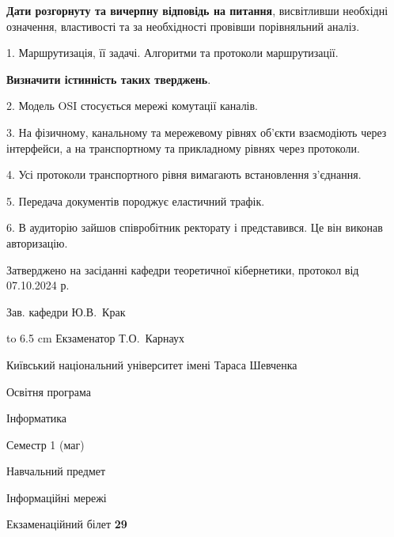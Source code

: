 \documentclass[12pt, ukrainian]{article}
\begin{document}
{
\qquad\textbf{Дати розгорнуту та вичерпну відповідь на питання}, висвітливши необхідні означення, властивості та за необхідності провівши порівняльний аналіз.

1. Маршрутизація, її задачі. Алгоритми та протоколи маршрутизації.



\qquad\textbf{Визначити істинність таких тверджень}.

2. Модель OSI стосується мережі комутації каналів.


3. На фізичному, канальному та мережевому рівнях об'єкти взаємодіють через інтерфейси, а на транспортному та прикладному рівнях через протоколи.


4. Усі протоколи транспортного рівня вимагають встановлення з'єднання.


5. Передача документів породжує еластичний трафік.


6. В аудиторію зайшов співробітник ректорату і представився. Це він виконав авторизацію.

}
{\smallskip\smallskip \begin {scriptsize} Затверджено на засіданні кафедри теоретичної кібернетики, протокол   від   07.10.2024 р.\par\smallskip\smallskip\smallskip\smallskip
{\parbox {6.5 cm} {Зав. кафедри \dotfill Ю.В.~Крак}}\hspace {0.7cm} {\hbox to 6.5 cm { Екзаменатор \dotfill Т.О.~Карнаух}} \end{scriptsize}}
\vspace{0.9cm}
{{\begin {scriptsize}\par
{ \center  Київський національний університет імені Тараса Шевченка \par}
{\parbox {5 cm}{Освітня програма \hfill}{\parbox {7 cm}{Інформатика\hfill}}\parbox {6 cm}{\hfill Семестр 1 (маг)}}\par
{\parbox {5 cm} {Навчальний предмет \hfill}\parbox {7 cm}{Інформаційні мережі \hfill}\parbox {6cm}{\hfill}\par}\vspace{-15pt} \end{scriptsize}}{\center Екзаменаційний білет \No \textbf { 29 }\par}}
\end{document}
